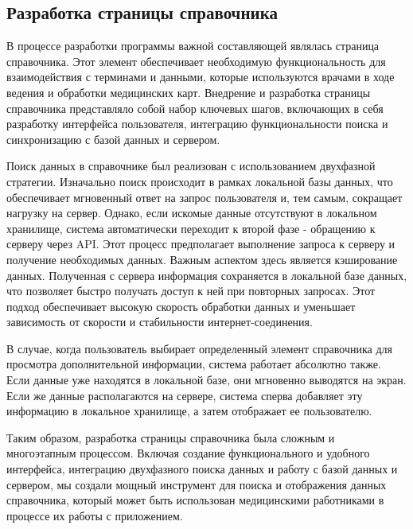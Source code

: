 \subsection{Разработка страницы справочника}
В процессе разработки программы важной составляющей являлась страница справочника. Этот элемент обеспечивает необходимую функциональность для взаимодействия с терминами и данными, которые используются врачами в ходе ведения и обработки медицинских карт. Внедрение и разработка страницы справочника представляло собой набор ключевых шагов, включающих в себя разработку интерфейса пользователя, интеграцию функциональности поиска и синхронизацию с базой данных и сервером.

Поиск данных в справочнике был реализован с использованием двухфазной стратегии. Изначально поиск происходит в рамках локальной базы данных, что обеспечивает мгновенный ответ на запрос пользователя и, тем самым, сокращает нагрузку на сервер. Однако, если искомые данные отсутствуют в локальном хранилище, система автоматически переходит к второй фазе - обращению к серверу через API. Этот процесс предполагает выполнение запроса к серверу и получение необходимых данных. Важным аспектом здесь является кэширование данных. Полученная с сервера информация сохраняется в локальной базе данных, что позволяет быстро получать доступ к ней при повторных запросах. Этот подход обеспечивает высокую скорость обработки данных и уменьшает зависимость от скорости и стабильности интернет-соединения.

В случае, когда пользователь выбирает определенный элемент справочника для просмотра дополнительной информации, система работает абсолютно также. Если данные уже находятся в локальной базе, они мгновенно выводятся на экран. Если же данные располагаются на сервере, система сперва добавляет эту информацию в локальное хранилище, а затем отображает ее пользователю.

Таким образом, разработка страницы справочника была сложным и многоэтапным процессом. Включая создание функционального и удобного интерфейса, интеграцию двухфазного поиска данных и работу с базой данных и сервером, мы создали мощный инструмент для поиска и отображения данных справочника, который может быть использован медицинскими работниками в процессе их работы с приложением.